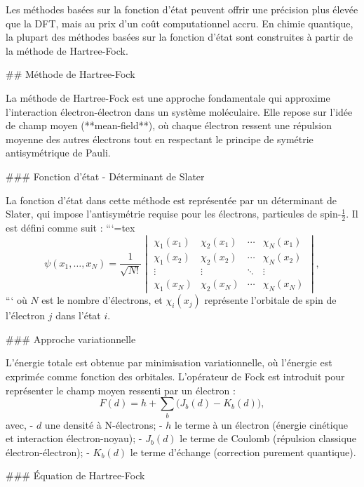 \documentclass[12pt,a4paper]{report}
\numberwithin{equation}{section}
\numberwithin{figure}{section}
\numberwithin{table}{section}
\begin{document}
\begin{markdown}
Les méthodes basées sur la fonction d'état peuvent offrir une précision plus élevée que la DFT, mais au prix d'un coût computationnel accru. En chimie quantique, la plupart des méthodes basées sur la fonction d'état sont construites à partir de la méthode de Hartree-Fock.

## Méthode de Hartree-Fock

La méthode de Hartree-Fock est une approche fondamentale qui approxime l’interaction électron-électron dans un système moléculaire. Elle repose sur l'idée de champ moyen (**mean-field**), où chaque électron ressent une répulsion moyenne des autres électrons tout en respectant le principe de symétrie antisymétrique de Pauli.

### Fonction d'état - Déterminant de Slater

La fonction d'état dans cette méthode est représentée par un déterminant de Slater, qui impose l'antisymétrie requise pour les électrons, particules de spin-$\frac12$. Il est défini comme suit :
```{=tex}
\begin{equation}
\psi(x_1, \ldots, x_N) = \frac{1}{\sqrt{N!}}
\begin{vmatrix}
\chi_1(x_1) & \chi_2(x_1) & \cdots & \chi_N(x_1) \\
\chi_1(x_2) & \chi_2(x_2) & \cdots & \chi_N(x_2) \\
\vdots & \vdots & \ddots & \vdots \\
\chi_1(x_N) & \chi_2(x_N) & \cdots & \chi_N(x_N)
\end{vmatrix} ,
\end{equation}
```
où $N$ est le nombre d'électrons, et $\chi_i(x_j)$ représente l'orbitale de spin de l'électron $j$ dans l'état $i$.

### Approche variationnelle

L’énergie totale est obtenue par minimisation variationnelle, où l'énergie est exprimée comme fonction des orbitales. L'opérateur de Fock est introduit pour représenter le champ moyen ressenti par un électron :
\begin{equation}
F(d) = h + \sum_b \big(J_b(d) - K_b(d)\big) ,
\end{equation}
avec,
- $d$ une densité à N-électrons;
- $h$ le terme à un électron (énergie cinétique et interaction électron-noyau);
- $J_b(d)$ le terme de Coulomb (répulsion classique électron-électron);
- $K_b(d)$ le terme d'échange (correction purement quantique).

### Équation de Hartree-Fock


\end{markdown}
\end{document}

